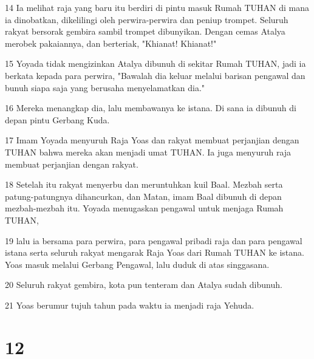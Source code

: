 \par 14 Ia melihat raja yang baru itu berdiri di pintu masuk Rumah TUHAN di mana ia dinobatkan, dikelilingi oleh perwira-perwira dan peniup trompet. Seluruh rakyat bersorak gembira sambil trompet dibunyikan. Dengan cemas Atalya merobek pakaiannya, dan berteriak, "Khianat! Khianat!"
\par 15 Yoyada tidak mengizinkan Atalya dibunuh di sekitar Rumah TUHAN, jadi ia berkata kepada para perwira, "Bawalah dia keluar melalui barisan pengawal dan bunuh siapa saja yang berusaha menyelamatkan dia."
\par 16 Mereka menangkap dia, lalu membawanya ke istana. Di sana ia dibunuh di depan pintu Gerbang Kuda.
\par 17 Imam Yoyada menyuruh Raja Yoas dan rakyat membuat perjanjian dengan TUHAN bahwa mereka akan menjadi umat TUHAN. Ia juga menyuruh raja membuat perjanjian dengan rakyat.
\par 18 Setelah itu rakyat menyerbu dan meruntuhkan kuil Baal. Mezbah serta patung-patungnya dihancurkan, dan Matan, imam Baal dibunuh di depan mezbah-mezbah itu. Yoyada menugaskan pengawal untuk menjaga Rumah TUHAN,
\par 19 lalu ia bersama para perwira, para pengawal pribadi raja dan para pengawal istana serta seluruh rakyat mengarak Raja Yoas dari Rumah TUHAN ke istana. Yoas masuk melalui Gerbang Pengawal, lalu duduk di atas singgasana.
\par 20 Seluruh rakyat gembira, kota pun tenteram dan Atalya sudah dibunuh.
\par 21 Yoas berumur tujuh tahun pada waktu ia menjadi raja Yehuda.

\chapter{12}

